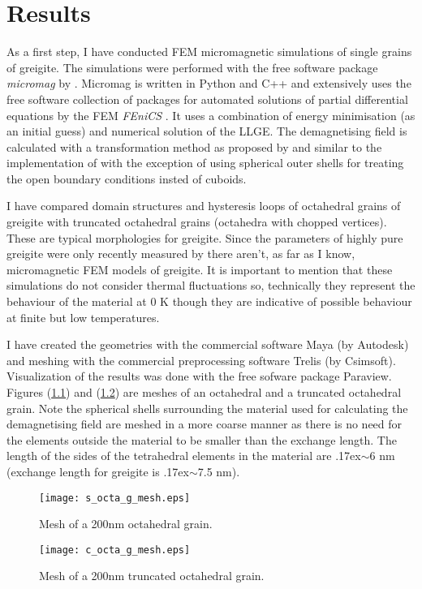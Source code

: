 
\chapter{Results}

\label{ch:results}

As a first step, I have conducted FEM micromagnetic simulations of single grains of greigite. The simulations were performed with the free software package \textit{micromag} by \citet{micromag}. Micromag is written in Python and C++ and extensively uses the free software collection of packages for automated solutions of partial differential equations by the FEM \textit{FEniCS} \citep{Fenics}. It uses a combination of energy minimisation (as an initial guess) and numerical solution of the LLGE. The demagnetising field is calculated with a transformation method as proposed by \citet{Brunotte} and similar to the implementation of \citet{Abert} with the exception of using spherical outer shells for treating the open boundary conditions insted of cuboids.\par

I have compared domain structures and hysteresis loops of octahedral grains of greigite with truncated octahedral grains (octahedra with chopped vertices). These are typical morphologies for greigite. Since the parameters of highly pure greigite were only recently measured by \citet{Chang} there aren't, as far as I know, micromagnetic FEM models of greigite. It is important to mention that these simulations do not consider thermal fluctuations so, technically they represent the behaviour of the material at 0 K though they are indicative of possible behaviour at finite but low temperatures.\par

I have created the geometries with the commercial software Maya (by Autodesk) and meshing with the commercial preprocessing software Trelis (by Csimsoft). Visualization of the results was done with the free sofware package Paraview. Figures (\ref{Fig2}) and (\ref{Fig3}) are meshes of an octahedral and a truncated octahedral grain. Note the spherical shells surrounding the material used for calculating the demagnetising field are meshed in a more coarse manner as there is no need for the elements outside the material to be smaller than the exchange length. The length of the sides of the tetrahedral elements in the material are {\raise.17ex\hbox{$\scriptstyle\sim$}}6 nm (exchange length for greigite is {\raise.17ex\hbox{$\scriptstyle\sim$}}7.5 nm).
\begin{figure}[ht]
\centering
\texttt{[image: s\_octa\_g\_mesh.eps]}
\caption{Mesh of a 200nm octahedral grain.}
\label{Fig2}
\end{figure}
\begin{figure}[ht]
\centering
\texttt{[image: c\_octa\_g\_mesh.eps]}
\caption{Mesh of a 200nm truncated octahedral grain.}
\label{Fig3}
\end{figure}

